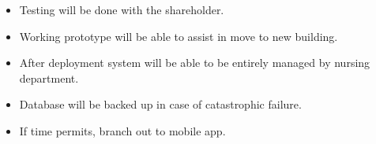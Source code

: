
\begin{itemize}
  \item Testing will be done with the shareholder.
  \item Working prototype will be able to assist in move to new building.
  \item After deployment system will be able to be entirely managed by nursing department.
  \item Database will be backed up in case of catastrophic failure.
  \item If time permits, branch out to mobile app.
\end{itemize}